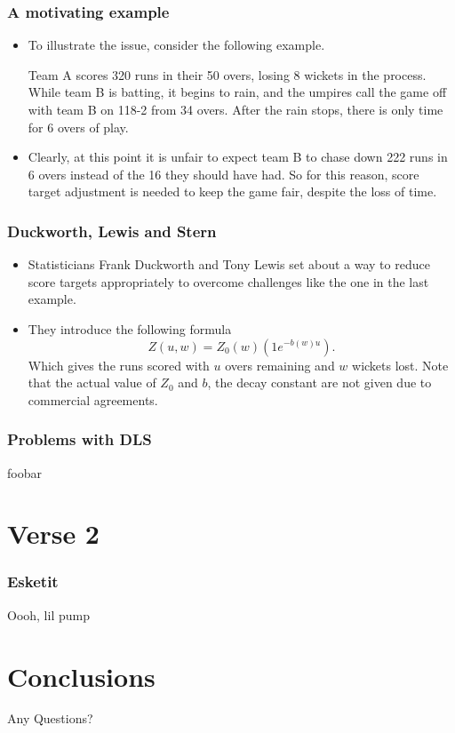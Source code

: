 \documentclass{beamer}
\begin{document}
\begin{frame}
    \frametitle{A motivating example}
    \begin{itemize}
        \item To illustrate the issue, consider the following example. \\
        \begin{example}
            Team A scores 320 runs in their 50 overs, losing 8 wickets in the process. While team B is batting, 
            it begins to rain, and the umpires call the game off with team B on 118-2 from 34 overs. After the rain stops,
            there is only time for 6 overs of play. 
        \end{example}
        \item Clearly, at this point it is unfair to expect team B to chase down 222 runs in 6 overs instead of the 16 they should 
            have had. So for this reason, score target adjustment is needed to keep the game fair, despite the loss of time.
\end{itemize}
        
\end{frame}

\begin{frame}
\frametitle{Duckworth, Lewis and Stern}

\begin{itemize}
    \item Statisticians Frank Duckworth and Tony Lewis set about a way to reduce score targets appropriately to overcome challenges
        like the one in the last example. \\
    \item They introduce the following formula
        \[
            Z(u,w) =  Z_0(w)(1e^{-b(w)u})
        .\] 
        Which gives the runs scored with $u$ overs remaining and $w$ wickets lost. Note that the actual value of $Z_0$ and $b$, the decay constant are not given due to commercial agreements.
\end{itemize}

\end{frame}

\begin{frame}
\frametitle{Problems with DLS}
foobar
    

\end{frame}

\section{Verse 2}
\begin{frame}
\frametitle{Esketit}
Oooh, lil pump
\end{frame}

\section{Conclusions}
\begin{frame}
\Huge{\centerline{Any Questions?}}
\end{frame}
\end{document}
